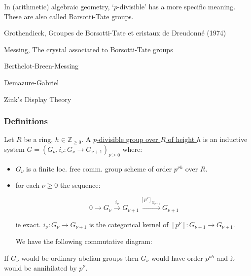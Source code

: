 \documentclass{article}
\theoremstyle{definition}
\numberwithin{theorem}{subsection}
\begin{document}
    In (arithmetic) algebraic geometry, `\(p\)-divisible' has a more specific meaning. These are also called Barsotti-Tate groups.

    Grothendieck, Groupes de Borsotti-Tate et eristaux de Dreudonn\'e (1974)

    Messing, The crystal associated to Borsotti-Tate groups

    Berthelot-Breen-Messing

    Demazure-Gabriel

    Zink's Display Theory

    \subsubsection{Definitions}

    Let \(R\) be a ring, \(h\in \mathbb{Z}_{\geq 0}\). A \underline{\(p\)-divisible group over \(R\) of height \(h\)} is an inductive system \(G = (G_\nu, i_\nu: G_\nu \to G_{\nu+1})_{\nu\geq 0}\) where:
    
    \begin{itemize}
        \item \(G_\nu\) is a finite loc. free comm. group scheme of order \(p^{\nu h}\) over \(R\).
        \item for each \(\nu \geq 0\) the sequence:
        
        \[
            0 \to G_\nu \xrightarrow{i_\nu} G_{\nu+1} \xrightarrow{[p^\nu]_{G_{\nu + 1}}} G_{\nu + 1}
        \]

        ie exact. \(i_\nu: G_\nu \to G_{\nu + 1}\) is the categorical kernel of \([p^\nu]: G_{\nu + 1} \to G_{\nu + 1}\).

        We have the following commutative diagram:

        \begin{center}
        \end{center}
    
    \end{itemize} 


    If \(G_\nu\) would be ordinary abelian groups then \(G_\nu\) would have order \(p^{\nu h}\) and it would be annihilated by \(p^\nu\).
\end{document}
